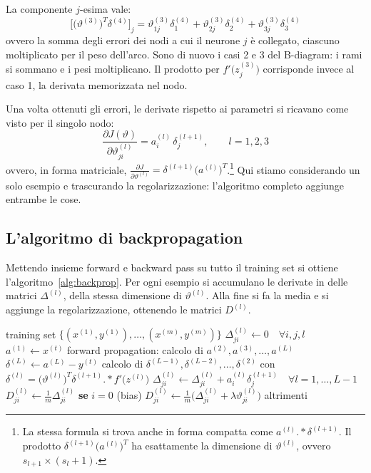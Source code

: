 La componente $j$-esima vale:
\[
\Big[\big(\vartheta^{(3)}\big)^T\delta^{(4)}\Big]_j = \vartheta_{1j}^{(3)}\delta_1^{(4)} + \vartheta_{2j}^{(3)}\delta_2^{(4)} + \vartheta_{3j}^{(3)}\delta_3^{(4)}
\]
ovvero la somma degli errori dei nodi a cui il neurone $j$ è collegato, ciascuno moltiplicato per il peso dell'arco. Sono di nuovo i casi 2 e 3 del B-diagram: i rami si sommano e i pesi moltiplicano. Il prodotto per $f'\big(z_j^{(3)}\big)$ corrisponde invece al caso 1, la derivata memorizzata nel nodo.

Una volta ottenuti gli errori, le derivate rispetto ai parametri si ricavano come visto per il singolo nodo:
\[
\frac{\partial J(\vartheta)}{\partial \vartheta_{ji}^{(l)}} = a_i^{(l)}\,\delta_j^{(l+1)}, \qquad l = 1, 2, 3
\]
ovvero, in forma matriciale, $\frac{\partial J}{\partial \vartheta^{(l)}} = \delta^{(l+1)}\big(a^{(l)}\big)^T$.\footnote{La stessa formula si trova anche in forma compatta come $a^{(l)} \mathbin{.*} \delta^{(l+1)}$. Il prodotto $\delta^{(l+1)}\big(a^{(l)}\big)^T$ ha esattamente la dimensione di $\vartheta^{(l)}$, ovvero $s_{l+1} \times (s_l + 1)$.} Qui stiamo considerando un solo esempio e trascurando la regolarizzazione: l'algoritmo completo aggiunge entrambe le cose.

\subsection{L'algoritmo di backpropagation}
Mettendo insieme forward e backward pass su tutto il training set si ottiene l'algoritmo~\ref{alg:backprop}. Per ogni esempio si accumulano le derivate in delle matrici $\Delta^{(l)}$, della stessa dimensione di $\vartheta^{(l)}$. Alla fine si fa la media e si aggiunge la regolarizzazione, ottenendo le matrici $D^{(l)}$.

\begin{algorithm}[htbp]
\caption{Backpropagation}\label{alg:backprop}
\begin{algorithmic}[1]
\Require training set $\{(x^{(1)}, y^{(1)}), \dots, (x^{(m)}, y^{(m)})\}$
\State $\Delta_{ji}^{(l)} \gets 0 \quad \forall i, j, l$
    \State $a^{(1)} \gets x^{(t)}$
    \State forward propagation: calcolo di $a^{(2)}, a^{(3)}, \dots, a^{(L)}$
    \State $\delta^{(L)} \gets a^{(L)} - y^{(t)}$
    \State calcolo di $\delta^{(L-1)}, \delta^{(L-2)}, \dots, \delta^{(2)}$ con $\delta^{(l)} = \big(\vartheta^{(l)}\big)^T\delta^{(l+1)} \mathbin{.*} f'\big(z^{(l)}\big)$
    \State $\Delta_{ji}^{(l)} \gets \Delta_{ji}^{(l)} + a_i^{(l)}\delta_j^{(l+1)} \quad \forall l = 1, \dots, L-1$
\EndFor
\State $D_{ji}^{(l)} \gets \frac{1}{m}\Delta_{ji}^{(l)}$ \textbf{se} $i = 0$ (bias)
\State $D_{ji}^{(l)} \gets \frac{1}{m}\big(\Delta_{ji}^{(l)} + \lambda\vartheta_{ji}^{(l)}\big)$ altrimenti
\end{algorithmic}
\end{algorithm}

